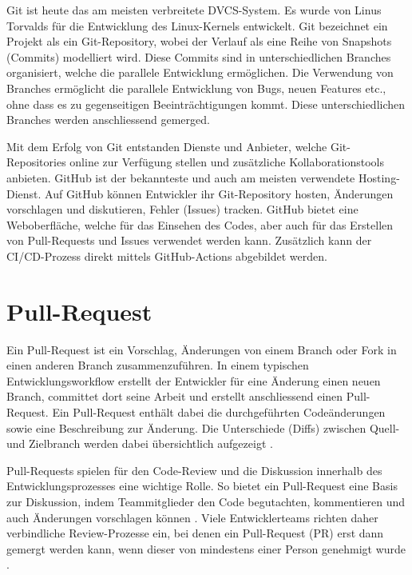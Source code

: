 Git ist heute das am meisten verbreitete DVCS-System. Es wurde von Linus Torvalds für die Entwicklung des Linux-Kernels entwickelt. \parencite{zack_git_2018} Git bezeichnet ein Projekt als ein Git-Repository, wobei der Verlauf als eine Reihe von Snapshots (Commits) modelliert wird. Diese Commits sind in unterschiedlichen Branches organisiert, welche die parallele Entwicklung ermöglichen. Die Verwendung von Branches ermöglicht die parallele Entwicklung von Bugs, neuen Features etc., ohne dass es zu gegenseitigen Beeinträchtigungen kommt. Diese unterschiedlichen Branches werden anschliessend gemerged. \parencite{noauthor_informationen_2025}   

Mit dem Erfolg von Git entstanden Dienste und Anbieter, welche Git-Repositories online zur Verfügung stellen und zusätzliche Kollaborationstools anbieten. GitHub ist der bekannteste und auch am meisten verwendete Hosting-Dienst. Auf GitHub können Entwickler ihr Git-Repository hosten, Änderungen vorschlagen und diskutieren, Fehler (Issues) tracken. GitHub bietet eine Weboberfläche, welche für das Einsehen des Codes, aber auch für das Erstellen von Pull-Requests und Issues verwendet werden kann. Zusätzlich kann der CI/CD-Prozess direkt mittels GitHub-Actions abgebildet werden. \parencite{noauthor_informationen_2025}  

\section{Pull-Request} 
Ein Pull-Request ist ein Vorschlag, Änderungen von einem Branch oder Fork in einen anderen Branch zusammenzuführen. In einem typischen Entwicklungsworkflow erstellt der Entwickler für eine Änderung einen neuen Branch, committet dort seine Arbeit und erstellt anschliessend einen Pull-Request. Ein Pull-Request enthält dabei die durchgeführten Codeänderungen sowie eine Beschreibung zur Änderung. Die Unterschiede (Diffs) zwischen Quell- und Zielbranch werden dabei übersichtlich aufgezeigt \parencite{noauthor_about_nodate}.

Pull-Requests spielen für den Code-Review und die Diskussion innerhalb des Entwicklungsprozesses eine wichtige Rolle. So bietet ein Pull-Request eine Basis zur Diskussion, indem Teammitglieder den Code begutachten, kommentieren und auch Änderungen vorschlagen können \parencite{atlassian_pull_nodate}. Viele Entwicklerteams richten daher verbindliche Review-Prozesse ein, bei denen ein Pull-Request (PR) erst dann gemergt werden kann, wenn dieser von mindestens einer Person genehmigt wurde \parencite{jiang_how_2022}.

